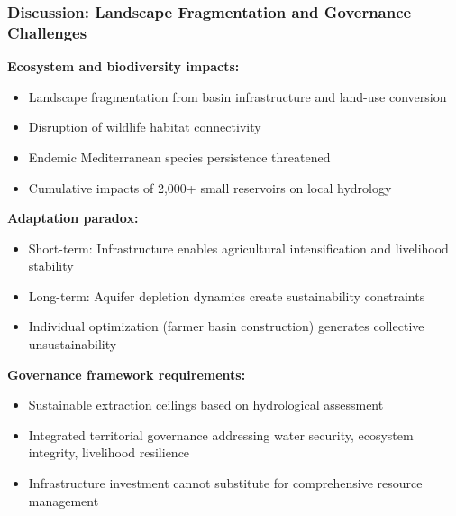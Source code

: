 \documentclass{beamer}
\begin{document}
\begin{frame}
\frametitle{Discussion: Landscape Fragmentation and Governance Challenges}

\textbf{Ecosystem and biodiversity impacts:}
\begin{itemize}
  \item Landscape fragmentation from basin infrastructure and land-use conversion
  \item Disruption of wildlife habitat connectivity
  \item Endemic Mediterranean species persistence threatened
  \item Cumulative impacts of 2,000+ small reservoirs on local hydrology
\end{itemize}

\vspace{0.3cm}

\textbf{Adaptation paradox:}
\begin{itemize}
  \item Short-term: Infrastructure enables agricultural intensification and livelihood stability
  \item Long-term: Aquifer depletion dynamics create sustainability constraints
  \item Individual optimization (farmer basin construction) generates collective unsustainability
\end{itemize}

\vspace{0.3cm}

\textbf{Governance framework requirements:}
\begin{itemize}
  \item Sustainable extraction ceilings based on hydrological assessment
  \item Integrated territorial governance addressing water security, ecosystem integrity, livelihood resilience
  \item Infrastructure investment cannot substitute for comprehensive resource management
\end{itemize}

\end{frame}

\end{document}
